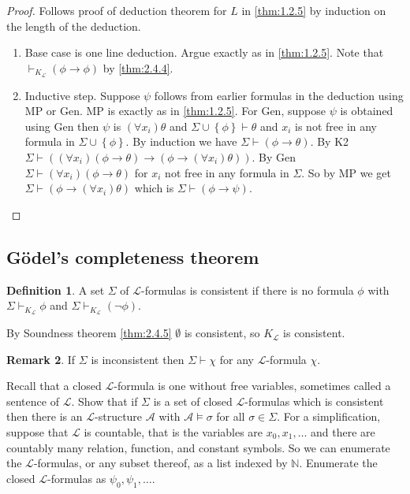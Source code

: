 \documentclass{article}
\newcommand{\N}{\mathbb{N}}
\newcommand{\A}{\mathcal{A}}
\renewcommand{\L}{\mathcal{L}}
\newcommand{\rb}[1]{\left( #1 \right)}
\newcommand{\cb}[1]{\left\{ #1 \right\}}
\newcommand{\notb}[1]{\rb{\neg #1}}
\newcommand{\impb}[2]{\rb{#1 \rightarrow #2}}
\newcommand{\fab}[1]{\rb{\forall #1}}
\theoremstyle{definition}\newtheorem{definition}{Definition}[subsection]
\theoremstyle{definition}\newtheorem{remark}[definition]{Remark}
\theoremstyle{definition}\newtheorem*{example}{Example}
\theoremstyle{definition}\newtheorem*{note}{Note}
\begin{document}
\begin{proof}
Follows proof of deduction theorem for $ L $ in \ref{thm:1.2.5} by induction on the length of the deduction.
\begin{enumerate}
\item Base case is one line deduction. Argue exactly as in \ref{thm:1.2.5}. Note that $ \vdash_{K_{\L}} \impb{\phi}{\phi} $ by \ref{thm:2.4.4}.
\item Inductive step. Suppose $ \psi $ follows from earlier formulas in the deduction using MP or Gen. MP is exactly as in \ref{thm:1.2.5}. For Gen, suppose $ \psi $ is obtained using Gen then $ \psi $ is $ \fab{x_i}\theta $ and $ \Sigma \cup \cb{\phi} \vdash \theta $ and $ x_i $ is not free in any formula in $ \Sigma \cup \cb{\phi} $. By induction we have $ \Sigma \vdash \impb{\phi}{\theta} $. By K2 $ \Sigma \vdash \impb{\fab{x_i}\impb{\phi}{\theta}}{\impb{\phi}{\fab{x_i}\theta}} $. By Gen $ \Sigma \vdash \fab{x_i}\impb{\phi}{\theta} $ for $ x_i $ not free in any formula in $ \Sigma $. So by MP we get $ \Sigma \vdash \impb{\phi}{\fab{x_i}\theta} $ which is $ \Sigma \vdash \impb{\phi}{\psi} $.
\end{enumerate}
\end{proof}


\subsection{Gödel's completeness theorem}

\begin{definition}
A set $ \Sigma $ of $ \L $-formulas is consistent if there is no formula $ \phi $ with $ \Sigma \vdash_{K_{\L}} \phi $ and $ \Sigma \vdash_{K_{\L}} \notb{\phi} $.
\end{definition}

By Soundness theorem \ref{thm:2.4.5} $ \emptyset $ is consistent, so $ K_{\L} $ is consistent.

\begin{remark}
If $ \Sigma $ is inconsistent then $ \Sigma \vdash \chi $ for any $ \L $-formula $ \chi $.
\end{remark}

Recall that a closed $ \L $-formula is one without free variables, sometimes called a sentence of $ \L $. Show that if $ \Sigma $ is a set of closed $ \L $-formulas which is consistent then there is an $ \L $-structure $ \A $ with $ \A \vDash \sigma $ for all $ \sigma \in \Sigma $. For a simplification, suppose that $ \L $ is countable, that is the variables are $ x_0, x_1, \dots $ and there are countably many relation, function, and constant symbols. So we can enumerate the $ \L $-formulas, or any subset thereof, as a list indexed by $ \N $. Enumerate the closed $ \L $-formulas as $ \psi_0, \psi_1, \dots $.
\end{document}
